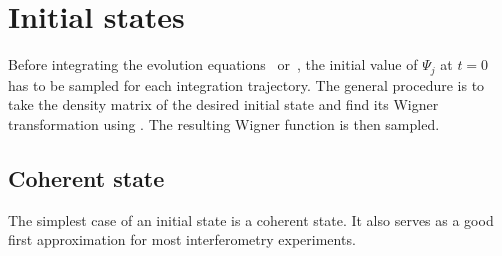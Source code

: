 \section{Initial states}

Before integrating the evolution equations~ or~, the initial value of $\Psi_j$ at $t=0$ has to be sampled for each integration trajectory.
The general procedure is to take the density matrix of the desired initial state and find its Wigner transformation using .
The resulting Wigner function is then sampled.


\subsection{Coherent state}

The simplest case of an initial state is a coherent state.
It also serves as a good first approximation for most  interferometry experiments.

